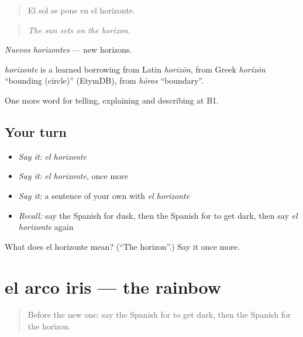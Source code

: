 \begin{quote}
El sol se pone en el horizonte.
\end{quote}

\begin{quote}
\emph{The sun sets on the horizon.}
\end{quote}

\emph{Nuevos horizontes} — new horizons.

\begin{cousinweb}
\emph{horizonte} is a learned borrowing from Latin \emph{horizōn}, from Greek \emph{horízōn} \textquotedblleft{}bounding (circle)\textquotedblright{} (EtymDB), from \emph{hóros} \textquotedblleft{}boundary\textquotedblright{}.
\end{cousinweb}

\begin{grammarlens}[title={What you've built}]
One more word for telling, explaining and describing at B1.
\end{grammarlens}

\subsection*{Your turn}
\begin{itemize}
\raggedright
  \item \emph{Say it:} \emph{el horizonte}
  \item \emph{Say it:} \emph{el horizonte}, once more
  \item \emph{Say it:} a sentence of your own with \emph{el horizonte}
  \item \emph{Recall:} say the Spanish for dusk, then the Spanish for to get dark, then say \emph{el horizonte} again
\end{itemize}

\begin{tcolorbox}[breakable,colback=teal!4,colframe=teal!35!black,title={Before you move on}]
What does el horizonte mean? (\textquotedblleft{}The horizon\textquotedblright{}.) Say it once more.
\end{tcolorbox}
\section[el arco iris]{el arco iris — the rainbow}

\label{lesson:ES-C703-arco-iris}



\begin{quote}
Before the new one: say the Spanish for to get dark, then the Spanish for the horizon.
\end{quote}

